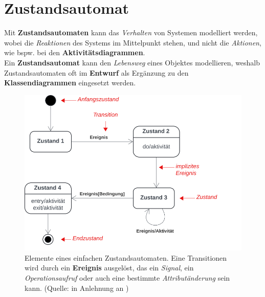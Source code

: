 \section{Zustandsautomat}

\begin{tcolorbox}[title=Zustandsautomat]
    Mit \textbf{Zustandsautomaten} kann das \textit{Verhalten} von Systemen modelliert werden, wobei die \textit{Reaktionen} des Systems im Mittelpunkt stehen, und nicht die \textit{Aktionen}, wie bspw. bei den \textbf{Aktivitätsdiagrammen}.\\

    \noindent
        Ein \textbf{Zustandsautomat} kann den \textit{Lebensweg} eines Objektes modellieren, weshalb Zustandsautomaten oft im \textbf{Entwurf} als Ergänzung zu den \textbf{Klassendiagrammen} eingesetzt werden.
\end{tcolorbox}

\begin{figure}
    \centering
    \includegraphics[scale=0.4]{part three/Zustandsautomaten/img/statechartdiagramnotation}
    \caption{Elemente eines einfachen Zustandsautomaten. Eine Transitionen wird durch ein \textbf{Ereignis} ausgelöst, das ein \textit{Signal}, ein \textit{Operationsaufruf} oder auch eine bestimmte \textit{Attributänderung} sein kann. (Quelle: in Anlehnung an \cite[90, Abb. 2.11-6]{Bal05})}
    \label{fig:statechartdiagramnotation-cc}
\end{figure}

